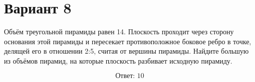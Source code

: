 \documentclass[12pt,a4paper]{article}
\begin{document}
\section*{Вариант 8}

Объём треугольной пирамиды равен 14. Плоскость проходит через сторону основания этой пирамиды и пересекает противоположное боковое ребро в точке, делящей его в отношении 2:5, считая от вершины пирамиды. Найдите большую из объёмов пирамид, на которые плоскость разбивает исходную пирамиду.

\begin{center}
\end{center}

\[
\boxed{\text{Ответ: }10}
\]
\end{document}
